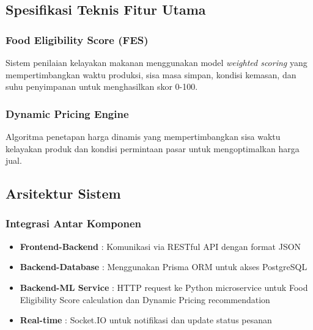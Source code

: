 \subsection{Spesifikasi Teknis Fitur Utama}

\subsubsection{Food Eligibility Score (FES)}
Sistem penilaian kelayakan makanan menggunakan model \textit{weighted scoring} yang mempertimbangkan waktu produksi, sisa masa simpan, kondisi kemasan, dan suhu penyimpanan untuk menghasilkan skor 0-100.

\subsubsection{Dynamic Pricing Engine}
Algoritma penetapan harga dinamis yang mempertimbangkan sisa waktu kelayakan produk dan kondisi permintaan pasar untuk mengoptimalkan harga jual.

\subsection{Arsitektur Sistem}

\subsubsection{Integrasi Antar Komponen}
\begin{itemize}[leftmargin=*]
    \item \textbf{Frontend-Backend} : Komunikasi via RESTful API dengan format JSON
    \item \textbf{Backend-Database} : Menggunakan Prisma ORM untuk akses PostgreSQL
    \item \textbf{Backend-ML Service} : HTTP request ke Python microservice untuk Food Eligibility Score calculation dan Dynamic Pricing recommendation
    \item \textbf{Real-time} : Socket.IO untuk notifikasi dan update status pesanan
\end{itemize}

